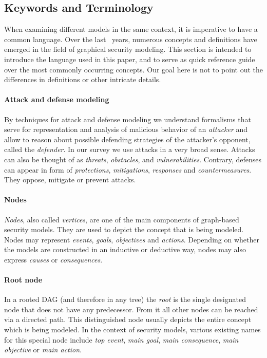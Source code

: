 \documentclass[a4paper]{article}
\begin{document}
\subsection{Keywords and Terminology}
\label{sec:terminology}

When examining different models in the same context, it is imperative to have a 
common language. Over the last~ years, numerous concepts and definitions 
have emerged in the field of graphical security modeling. This section is
intended to introduce the language used in this paper, and to serve as quick 
reference guide over the most commonly occurring concepts. Our goal here is not 
to point out the differences in definitions or other intricate details. 

\paragraph{Attack and defense modeling} 
By techniques for attack and defense modeling we understand formalisms that
serve for representation and analysis of malicious behavior of an
\emph{attacker} and allow to reason about possible defending strategies of the
attacker's opponent, called the \emph{defender}. In our survey we use attacks in
a very broad sense. Attacks can also be thought of as \emph{threats}, 
\emph{obstacles}, and \emph{vulnerabilities}. Contrary, defenses can appear in 
form of \emph{protections}, \emph{mitigations}, \emph{responses} and 
\emph{countermeasures}. They oppose, mitigate or prevent attacks. 

\paragraph{Nodes}
\emph{Nodes}, also called \emph{vertices}, are one of the main components of
graph-based security models. They are used to depict the concept that is being
modeled. Nodes may represent \emph{events}, \emph{goals}, \emph{objectives} and
\emph{actions}. Depending on whether the models are constructed in an inductive
or deductive way, nodes may also express \emph{causes} or \emph{consequences}.

\paragraph{Root node}
In a rooted DAG (and therefore in any tree) the \emph{root} is the single
designated node that does not have any predecessor. From it all other nodes can
be reached via a directed path. This distinguished node usually depicts the
entire concept which is being modeled. In the context of security models, 
various existing names for this special node include \emph{top event}, 
\emph{main goal}, \emph{main consequence}, \emph{main objective} or \emph{main
action}.
\end{document}
